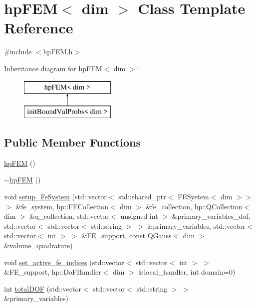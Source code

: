 \section{hp\-F\-E\-M$<$ dim $>$ Class Template Reference}
\label{classhp_f_e_m}


{\ttfamily \#include $<$hp\-F\-E\-M.\-h$>$}

Inheritance diagram for hp\-F\-E\-M$<$ dim $>$\-:\begin{figure}[H]
\begin{center}
\leavevmode
\includegraphics[height=2.000000cm]{classhp_f_e_m}
\end{center}
\end{figure}
\subsection*{Public Member Functions}
\begin{DoxyCompactItemize}
\item 
\hyperlink{classhp_f_e_m_ac1540fdd371c0b89a90809251b618025}{hp\-F\-E\-M} ()
\item 
\hyperlink{classhp_f_e_m_acf426058508649734ee9618b5c9148c1}{$\sim$hp\-F\-E\-M} ()
\item 
void \hyperlink{classhp_f_e_m_afe86b756fb757221f5a8a16c956b7e76}{setup\-\_\-\-Fe\-System} (std\-::vector$<$ std\-::shared\-\_\-ptr$<$ F\-E\-System$<$ dim $>$$>$ $>$ \&fe\-\_\-system, hp\-::\-F\-E\-Collection$<$ dim $>$ \&fe\-\_\-collection, hp\-::\-Q\-Collection$<$ dim $>$ \&q\-\_\-collection, std\-::vector$<$ unsigned int $>$ \&primary\-\_\-variables\-\_\-dof, std\-::vector$<$ std\-::vector$<$ std\-::string $>$ $>$ \&primary\-\_\-variables, std\-::vector$<$ std\-::vector$<$ int $>$ $>$ \&F\-E\-\_\-support, const Q\-Gauss$<$ dim $>$ \&volume\-\_\-quadrature)
\item 
void \hyperlink{classhp_f_e_m_a12205240784051ad249a536cb7ee98d5}{set\-\_\-active\-\_\-fe\-\_\-indices} (std\-::vector$<$ std\-::vector$<$ int $>$ $>$ \&F\-E\-\_\-support, hp\-::\-Do\-F\-Handler$<$ dim $>$ \&local\-\_\-handler, int domain=0)
\item 
int \hyperlink{classhp_f_e_m_a9ceee3881af75e3be863fdb2d1688c0e}{total\-D\-O\-F} (std\-::vector$<$ std\-::vector$<$ std\-::string $>$ $>$ \&primary\-\_\-variables)
\end{DoxyCompactItemize}
